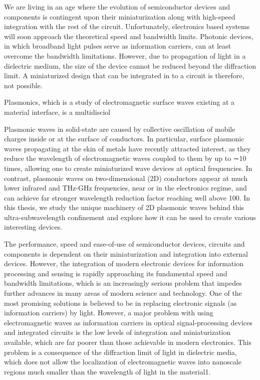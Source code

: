 We are living in an age where the evolution of semiconductor devices and components is contingent upon their miniaturization along with high-speed integration with the rest of the circuit. Unfortunately, electronics based systems will soon approach the theoretical speed and bandwidth limits. Photonic devices, in which broadband light pulses serve as information carriers, can at least overcome the bandwidth limitations. However, due to propagation of light in a dielectric medium, the size of the device cannot be reduced beyond the diffraction limit. A miniaturized design that can be integrated in to a circuit is therefore, not possible.

Plasmonics, which is a study of electromagnetic surface waves existing at a material interface, is a multidisciol 


Plasmonic waves in solid-state are caused by collective oscillation of mobile charges inside or at the
surface of conductors. In particular, surface plasmonic waves propagating at the skin of metals have
recently attracted interest, as they reduce the wavelength of electromagnetic waves coupled to them by
up to ∼10 times, allowing one to create miniaturized wave devices at optical frequencies. In contrast,
plasmonic waves on two-dimensional (2D) conductors appear at much lower infrared and THz-GHz
frequencies, near or in the electronics regime, and can achieve far stronger wavelength reduction factor
reaching well above 100. In this thesis, we study the unique machinery of 2D plasmonic waves behind
this ultra-subwavelength confinement and explore how it can be used to create various interesting devices.

The performance, speed and ease-of-use of semiconductor devices, circuits and components is dependent on their miniaturization and integration into external devices. However, the integration of modern electronic devices for information processing and sensing is rapidly approaching its fundamental speed and bandwidth limitations, which is an increasingly serious problem that impedes further advances in many areas of modern science and technology. One of the most promising solutions is believed to be in replacing electronic signals (as information carriers) by light. However, a major problem with using electromagnetic waves as information carriers in optical signal-processing devices and integrated circuits is the low levels of integration and miniaturization available, which are far poorer than those achievable in modern electronics. This problem is a consequence of the diffraction limit of light in dielectric media, which does not allow the localization of electromagnetic waves into nanoscale regions much smaller than the wavelength of light in the material1.

